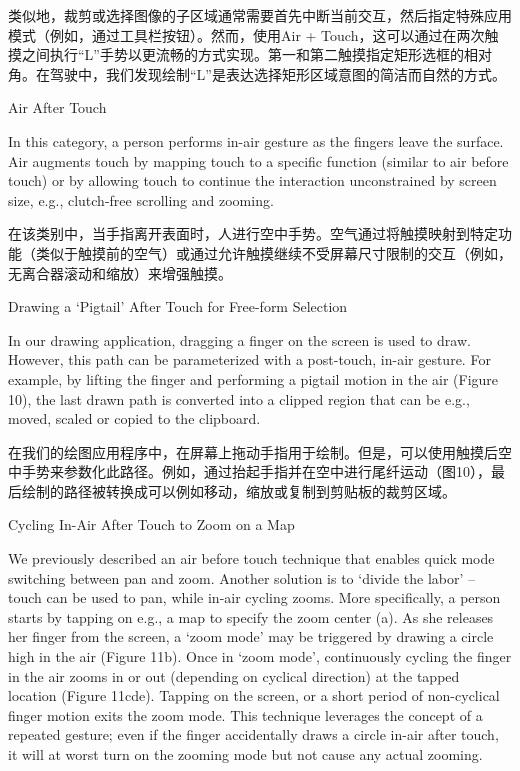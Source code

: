 类似地，裁剪或选择图像的子区域通常需要首先中断当前交互，然后指定特殊应用模式（例如，通过工具栏按钮）。然而，使用Air + Touch，这可以通过在两次触摸之间执行“L”手势以更流畅的方式实现。第一和第二触摸指定矩形选框的相对角。在驾驶中，我们发现绘制“L”是表达选择矩形区域意图的简洁而自然的方式。

Air After Touch

In this category, a person performs in-air gesture as the fingers leave the surface. Air augments touch by mapping touch to a specific function (similar to air before touch) or by allowing touch to continue the interaction unconstrained by screen size, e.g., clutch-free scrolling and zooming.

在该类别中，当手指离开表面时，人进行空中手势。空气通过将触摸映射到特定功能（类似于触摸前的空气）或通过允许触摸继续不受屏幕尺寸限制的交互（例如，无离合器滚动和缩放）来增强触摸。

Drawing a ‘Pigtail’ After Touch for Free-form Selection

In our drawing application, dragging a finger on the screen is used to draw. However, this path can be parameterized with a post-touch, in-air gesture. For example, by lifting the finger and performing a pigtail motion in the air (Figure 10), the last drawn path is converted into a clipped region that can be e.g., moved, scaled or copied to the clipboard.

在我们的绘图应用程序中，在屏幕上拖动手指用于绘制。但是，可以使用触摸后空中手势来参数化此路径。例如，通过抬起手指并在空中进行尾纤运动（图10），最后绘制的路径被转换成可以例如移动，缩放或复制到剪贴板的裁剪区域。

Cycling In-Air After Touch to Zoom on a Map

We previously described an air before touch technique that enables quick mode switching between pan and zoom. Another solution is to ‘divide the labor’ – touch can be used to pan, while in-air cycling zooms. More specifically, a person starts by tapping on e.g., a map to specify the zoom center (a). As she releases her finger from the screen, a ‘zoom mode’ may be triggered by drawing
a circle high in the air (Figure 11b). Once in ‘zoom mode’, continuously cycling the finger in the air zooms in or out (depending on cyclical direction) at the tapped location (Figure 11cde). Tapping on the screen, or a short period of non-cyclical finger motion exits the zoom mode. This technique leverages the concept of a repeated gesture; even if the finger accidentally draws a circle in-air after touch, it will at worst turn on the zooming mode but not cause any actual zooming.

